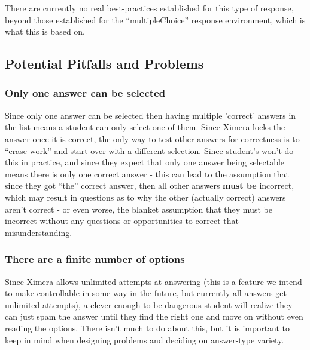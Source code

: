 \documentclass{ximera}
\begin{document}
        There are currently no real best-practices established for this type of response, beyond those established for the ``multipleChoice'' response environment, which is what this is based on.
        
        

    \subsection*{Potential Pitfalls and Problems}
    
        
        \subsubsection*{Only one answer can be selected}
            Since only one answer can be selected then having multiple 'correct' answers in the list means a student can only select one of them. Since Ximera locks the answer once it is correct, the only way to test other answers for correctness is to ``erase work'' and start over with a different selection. Since student's won't do this in practice, and since they expect that only one answer being selectable means there is only one correct answer - this can lead to the assumption that since they got ``the'' correct answer, then all other answers \textbf{must be} incorrect, which may result in questions as to why the other (actually correct) answers aren't correct - or even worse, the blanket assumption that they must be incorrect without any questions or opportunities to correct that misunderstanding.
            
        \subsubsection*{There are a finite number of options}
            Since Ximera allows unlimited attempts at answering (this is a feature we intend to make controllable in some way in the future, but currently all answers get unlimited attempts), a clever-enough-to-be-dangerous student will realize they can just spam the answer until they find the right one and move on without even reading the options. There isn't much to do about this, but it is important to keep in mind when designing problems and deciding on answer-type variety.
            
\end{document}
